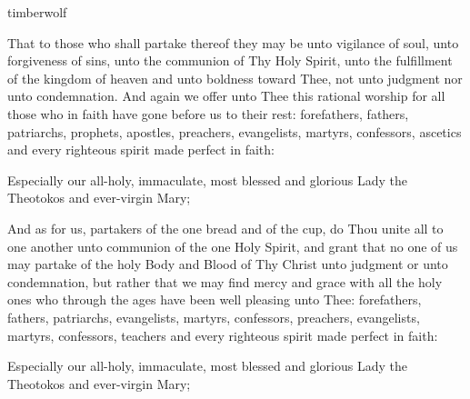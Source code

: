 \documentclass[twoside, letterpaper, 12pt]{report}
\begin{document}
\clearpage
\begin{variables}{timberwolf}
\begin{priest}
\footnotesize
\item That to those who shall partake thereof they may be unto vigilance of soul,
  unto forgiveness of sins, unto the communion of Thy Holy Spirit,
  unto the fulfillment of the kingdom of heaven and unto boldness toward Thee,
  not unto judgment nor unto condemnation.
  And again we offer unto Thee this rational worship for all those who in faith
  have gone before us to their rest:
  forefathers, fathers, patriarchs, prophets, apostles, preachers, evangelists,
  martyrs, confessors, ascetics and every righteous spirit made perfect in faith:
\normalsize
\item Especially our all-holy, immaculate,
  most blessed and glorious Lady the Theotokos and ever-virgin Mary;
\end{priest}
\vspace{5pt}





\vspace{1in}

\begin{priest}
  \footnotesize
  \item And as for us, partakers of the one bread and of the cup,
    do Thou unite all to one another unto communion of the one Holy Spirit,
    and grant that no one of us may partake of the holy Body and Blood of Thy Christ
    unto judgment or unto condemnation, but rather that we may find mercy and grace
    with all the holy ones who through the ages have been well pleasing unto Thee:
    forefathers, fathers, patriarchs, evangelists, martyrs, confessors, preachers, evangelists,
    martyrs, confessors, teachers and every righteous spirit made perfect in faith:
  \normalsize
  \item Especially our all-holy, immaculate,
    most blessed and glorious Lady the Theotokos and ever-virgin Mary;
\end{priest}


\end{variables}
\end{document}
